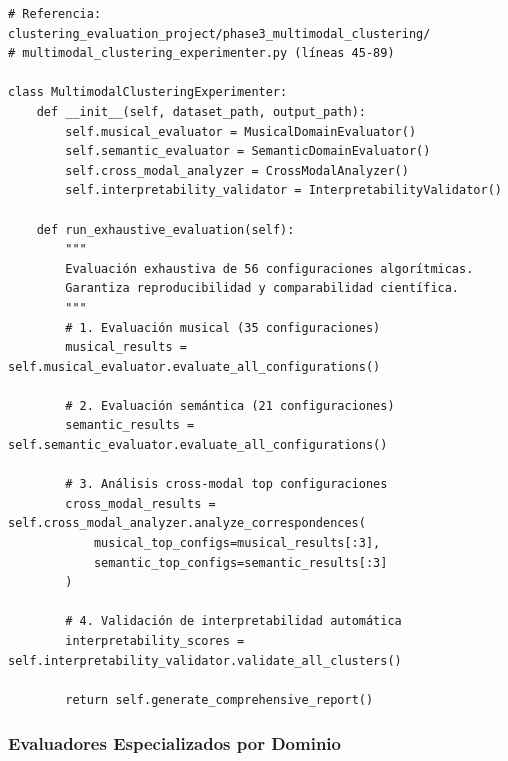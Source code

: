 \documentclass[12pt,a4paper]{report}
\begin{document}
\begin{lstlisting}[caption={Arquitectura del Sistema de Evaluación Multimodal}]
# Referencia: clustering_evaluation_project/phase3_multimodal_clustering/
# multimodal_clustering_experimenter.py (líneas 45-89)

class MultimodalClusteringExperimenter:
    def __init__(self, dataset_path, output_path):
        self.musical_evaluator = MusicalDomainEvaluator()
        self.semantic_evaluator = SemanticDomainEvaluator()
        self.cross_modal_analyzer = CrossModalAnalyzer()
        self.interpretability_validator = InterpretabilityValidator()

    def run_exhaustive_evaluation(self):
        """
        Evaluación exhaustiva de 56 configuraciones algorítmicas.
        Garantiza reproducibilidad y comparabilidad científica.
        """
        # 1. Evaluación musical (35 configuraciones)
        musical_results = self.musical_evaluator.evaluate_all_configurations()

        # 2. Evaluación semántica (21 configuraciones)
        semantic_results = self.semantic_evaluator.evaluate_all_configurations()

        # 3. Análisis cross-modal top configuraciones
        cross_modal_results = self.cross_modal_analyzer.analyze_correspondences(
            musical_top_configs=musical_results[:3],
            semantic_top_configs=semantic_results[:3]
        )

        # 4. Validación de interpretabilidad automática
        interpretability_scores = self.interpretability_validator.validate_all_clusters()

        return self.generate_comprehensive_report()
\end{lstlisting}

\subsubsection{Evaluadores Especializados por Dominio}
\end{document}
